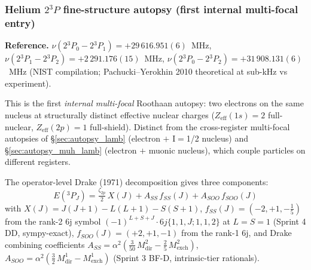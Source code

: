 \documentclass[11pt]{article}
\begin{document}
\subsubsection{Helium $2{}^3P$ fine-structure autopsy (first internal multi-focal entry)}
\label{sec:autopsy_he_2_3p}

\textbf{Reference.}  $\nu(2{}^3P_0 - 2{}^3P_1) = +29\,616.951(6)$~MHz,
$\nu(2{}^3P_1 - 2{}^3P_2) = +2\,291.176(15)$~MHz,
$\nu(2{}^3P_0 - 2{}^3P_2) = +31\,908.131(6)$~MHz (NIST compilation;
Pachucki--Yerokhin 2010 theoretical at sub-kHz vs experiment).

This is the first \emph{internal multi-focal} Roothaan autopsy: two electrons
on the same nucleus at structurally distinct effective nuclear charges
($Z_\text{eff}(1s) = 2$ full-nuclear, $Z_\text{eff}(2p) = 1$ full-shield).
Distinct from the cross-register multi-focal autopsies of \S\ref{sec:autopsy_lamb}
(electron $+$ I$=$1/2 nucleus) and \S\ref{sec:autopsy_muh_lamb} (electron $+$
muonic nucleus), which couple particles on different registers.

The operator-level Drake (1971) decomposition gives three components:
\begin{equation}
E({}^3P_J) = \tfrac{\zeta_{2p}}{2}\, X(J) + A_{SS}\, f_{SS}(J)
              + A_{SOO}\, f_{SOO}(J)
\end{equation}
with
$X(J) = J(J+1) - L(L+1) - S(S+1)$,
$f_{SS}(J) = (-2, +1, -\tfrac{1}{5})$ from the rank-2 6j symbol
$(-1)^{L+S+J}\cdot 6j\{1,1,J;1,1,2\}$ at $L = S = 1$ (Sprint 4 DD,
sympy-exact),
$f_{SOO}(J) = (+2, +1, -1)$ from the rank-1 6j,
and Drake combining coefficients
$A_{SS} = \alpha^2 (\tfrac{3}{50}\, M^2_\text{dir} - \tfrac{2}{5}\, M^2_\text{exch})$,
$A_{SOO} = \alpha^2 (\tfrac{3}{2}\, M^1_\text{dir} - M^1_\text{exch})$
(Sprint 3 BF-D, intrinsic-tier rationals).
\end{document}
